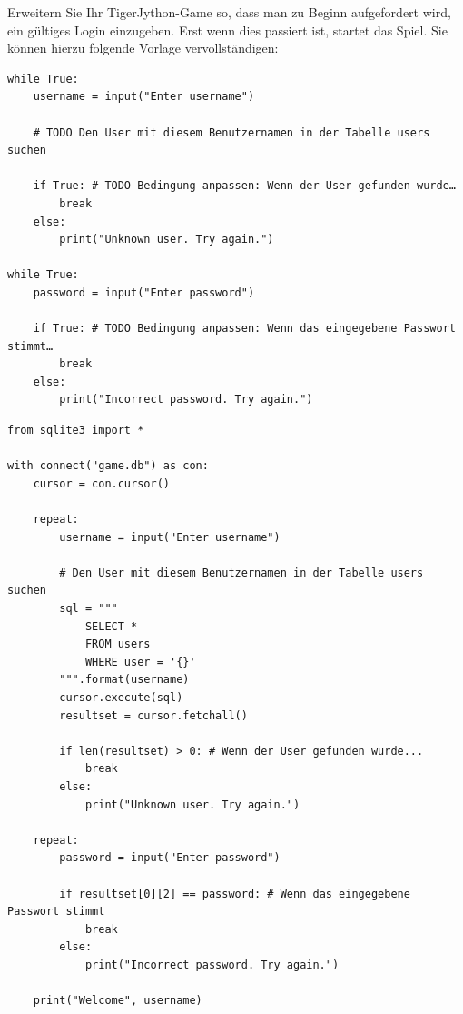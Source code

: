 \begin{myexercise}
Erweitern Sie Ihr TigerJython-Game so, dass man zu Beginn aufgefordert wird, ein gültiges Login einzugeben. Erst wenn dies passiert ist, startet das Spiel. Sie können hierzu folgende Vorlage vervollständigen:
\begin{lstlisting}
while True:
    username = input("Enter username")

    # TODO Den User mit diesem Benutzernamen in der Tabelle users suchen
    
    if True: # TODO Bedingung anpassen: Wenn der User gefunden wurde…
        break
    else:
        print("Unknown user. Try again.")

while True:
    password = input("Enter password")

    if True: # TODO Bedingung anpassen: Wenn das eingegebene Passwort stimmt…
        break
    else:
        print("Incorrect password. Try again.")
\end{lstlisting}
\begin{myanswer}
\begin{lstlisting}
from sqlite3 import *

with connect("game.db") as con:
    cursor = con.cursor()
    
    repeat:
        username = input("Enter username")
    
        # Den User mit diesem Benutzernamen in der Tabelle users suchen
        sql = """
            SELECT * 
            FROM users
            WHERE user = '{}'
        """.format(username)
        cursor.execute(sql)
        resultset = cursor.fetchall()
        
        if len(resultset) > 0: # Wenn der User gefunden wurde...
            break
        else:
            print("Unknown user. Try again.")
    
    repeat:
        password = input("Enter password")
    
        if resultset[0][2] == password: # Wenn das eingegebene Passwort stimmt
            break
        else:
            print("Incorrect password. Try again.")
            
    print("Welcome", username)

\end{lstlisting}
\end{myanswer}
\end{myexercise}

